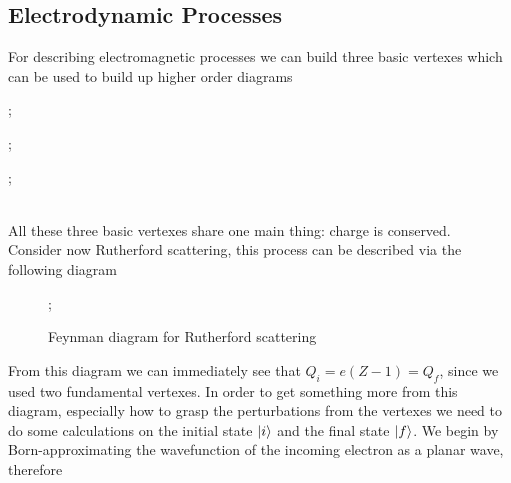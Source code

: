 \documentclass[../qm.tex]{subfiles}
\begin{document}
\subsection{Electrodynamic Processes}
For describing electromagnetic processes we can build three basic vertexes which can be used to build up higher order diagrams\\
\begin{minipage}[H]{0.33\linewidth}
	\begin{center}
	;
\end{center}
\end{minipage}
\begin{minipage}[H]{0.33\linewidth}
	\begin{center}
	;
\end{center}
\end{minipage}
\begin{minipage}[H]{0.33\linewidth}
	\begin{center}
	;
	\end{center}
\end{minipage}\\
All these three basic vertexes share one main thing: charge is conserved.\\
Consider now Rutherford scattering, this process can be described via the following diagram
\begin{figure}[H]
	\centering
	;
	\caption{Feynman diagram for Rutherford scattering}
	\label{fig:rutherfordfeynmand}
\end{figure}
From this diagram we can immediately see that $Q_i=e(Z-1)=Q_f$, since we used two fundamental vertexes. In order to get something more from this diagram, especially how to grasp the perturbations from the vertexes we need to do some calculations on the initial state $\ket{i}$ and the final state $\ket{f}$. We begin by Born-approximating the wavefunction of the incoming electron as a planar wave, therefore
\end{document}
